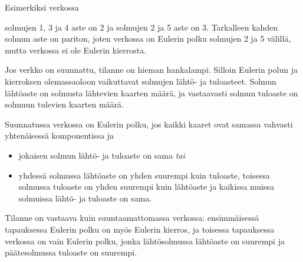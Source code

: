 \begin{samepage}
Esimerkiksi verkossa
\begin{center}
\end{center}
\end{samepage}
solmujen 1, 3 ja 4 aste on 2 ja solmujen 2 ja 5 aste on 3.
Tarkalleen kahden solmun aste on pariton,
joten verkossa on Eulerin polku solmujen 2 ja 5 välillä,
mutta verkossa ei ole Eulerin kierrosta.

Jos verkko on suunnattu, tilanne on hieman hankalampi.
Silloin Eulerin polun ja kierroksen olemassaoloon
vaikuttavat solmujen lähtö- ja tuloasteet.
Solmun lähtöaste on solmusta lähtevien kaarten määrä,
ja vastaavasti solmun tuloaste on solmuun tulevien kaarten määrä.

Suunnatussa verkossa on Eulerin polku, jos
kaikki kaaret ovat samassa vahvasti yhtenäisessä
komponentissa ja
\begin{itemize}
\item jokaisen solmun lähtö- ja tuloaste on sama \textit{tai}
\item yhdessä solmussa lähtöaste on yhden suurempi kuin tuloaste,
toisessa solmussa tuloaste on yhden suurempi kuin lähtöaste
ja kaikissa muissa solmuissa lähtö- ja tuloaste on sama.
\end{itemize}

Tilanne on vastaava kuin suuntaamattomassa verkossa:
ensimmäisessä tapauksessa Eulerin polku on myös Eulerin kierros,
ja toisessa tapauksessa verkossa on vain Eulerin polku,
jonka lähtösolmussa lähtöaste on suurempi ja
päätesolmussa tuloaste on suurempi.

